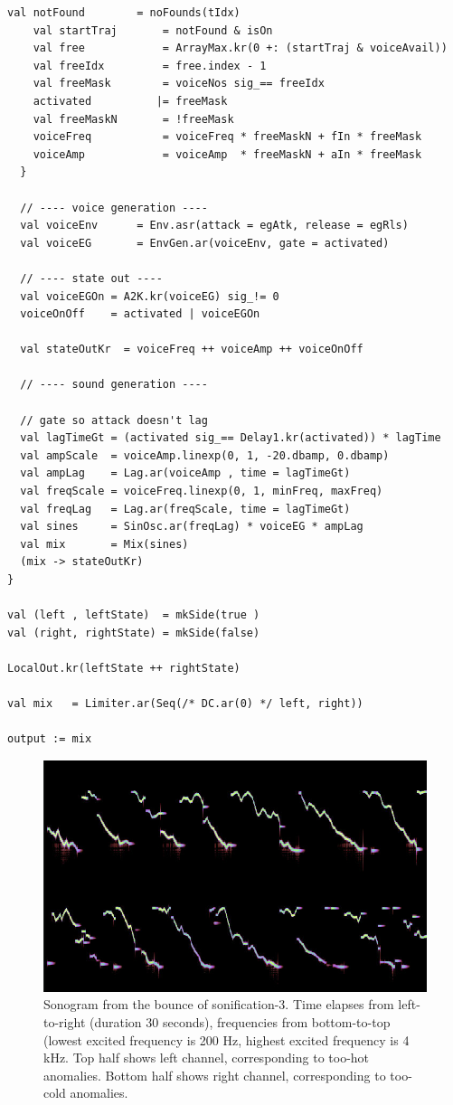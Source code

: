 \documentclass[11pt,a4paper]{article}
\begin{document}
\begin{lstlisting}[style=scala-small]
    val notFound        = noFounds(tIdx)
    val startTraj       = notFound & isOn
    val free            = ArrayMax.kr(0 +: (startTraj & voiceAvail))
    val freeIdx         = free.index - 1
    val freeMask        = voiceNos sig_== freeIdx
    activated          |= freeMask
    val freeMaskN       = !freeMask
    voiceFreq           = voiceFreq * freeMaskN + fIn * freeMask
    voiceAmp            = voiceAmp  * freeMaskN + aIn * freeMask
  }
  
  // ---- voice generation ----
  val voiceEnv      = Env.asr(attack = egAtk, release = egRls)
  val voiceEG       = EnvGen.ar(voiceEnv, gate = activated)
  
  // ---- state out ----
  val voiceEGOn = A2K.kr(voiceEG) sig_!= 0
  voiceOnOff    = activated | voiceEGOn
  
  val stateOutKr  = voiceFreq ++ voiceAmp ++ voiceOnOff
  
  // ---- sound generation ----
  
  // gate so attack doesn't lag
  val lagTimeGt = (activated sig_== Delay1.kr(activated)) * lagTime
  val ampScale  = voiceAmp.linexp(0, 1, -20.dbamp, 0.dbamp)
  val ampLag    = Lag.ar(voiceAmp , time = lagTimeGt)
  val freqScale = voiceFreq.linexp(0, 1, minFreq, maxFreq)
  val freqLag   = Lag.ar(freqScale, time = lagTimeGt)
  val sines     = SinOsc.ar(freqLag) * voiceEG * ampLag
  val mix       = Mix(sines)
  (mix -> stateOutKr)
}

val (left , leftState)  = mkSide(true )
val (right, rightState) = mkSide(false)

LocalOut.kr(leftState ++ rightState)

val mix   = Limiter.ar(Seq(/* DC.ar(0) */ left, right))

output := mix
\end{lstlisting}

\begin{figure}
\includegraphics[width=\textwidth]{figures/sonif-3-bounce-sonogram.jpg}
\caption{Sonogram from the bounce of sonification-3. Time elapses from left-to-right (duration 30 seconds), frequencies from bottom-to-top (lowest excited frequency is 200 Hz, highest excited frequency is 4 kHz. Top half shows left channel, corresponding to too-hot anomalies. Bottom half shows right channel, corresponding to too-cold anomalies.}
\label{fig:sonif-3-bounce-sonogram}
\end{figure}
\end{document}
